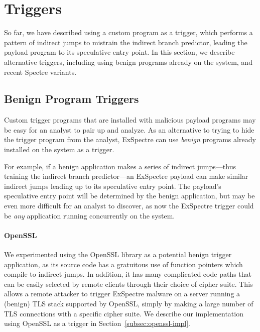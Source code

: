 

\section{Triggers}

So far, we have described using a custom program as a trigger, which performs a
pattern of indirect jumps to mistrain the indirect branch predictor, leading the payload program
to its speculative entry point. In this
section, we describe alternative triggers, including using benign programs
already on the system, and recent Spectre variants.

\subsection{Benign Program Triggers}
\label{subsec:openssl}

Custom trigger programs that are installed with malicious payload programs may
be easy for an analyst to pair up and analyze. As an alternative to trying to
hide the trigger program from the analyst, ExSpectre can use \emph{benign}
programs already installed on the system as a trigger.

For example, if a benign application makes a series of indirect jumps---thus training
the indirect branch predictor---an ExSpectre payload can make similar indirect
jumps leading up to its speculative entry point. The payload's speculative entry
point will be determined by the benign application, but may be even more
difficult for an analyst to discover, as now the ExSpectre trigger could be
\emph{any} application running concurrently on the system.

\paragraph{OpenSSL}
We experimented using the OpenSSL library as a potential benign trigger
application, as its source code has a gratuitous use of function pointers which
compile to indirect jumps. In addition, it has many complicated code paths that
can be easily selected by remote clients through their choice of cipher suite.
This allows a remote attacker to trigger ExSpectre malware on a server running a
(benign) TLS stack supported by OpenSSL, simply by making a large number of TLS
connections with a specific cipher suite. We describe our implementation using
OpenSSL as a trigger in Section~\ref{subsec:openssl-impl}.

